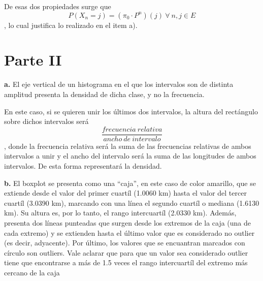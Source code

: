 \documentclass[11pt]{article}
\begin{document}
De esas dos propiedades surge que $$P(X_n = j) = (\pi_0 \cdot P^n)(j)\ \forall\ n,j \in E$$, lo cual justifica lo realizado en el item a).

\section*{Parte II}

\textbf{a.}
El eje vertical de un histograma en el que los intervalos son de distinta amplitud presenta la densidad de dicha clase, y no la frecuencia.

En este caso, si se quieren unir los últimos dos intervalos, la altura del rectángulo sobre dichos intervalos será $$\frac{frecuencia\ relativa}{ancho\ de\ intervalo}$$, donde la frecuencia relativa será la suma de las frecuencias relativas de ambos intervalos a unir y el ancho del intervalo será la suma de las longitudes de ambos intervalos. De esta forma representará la densidad.

\textbf{b.}
El boxplot se presenta como una ``caja'', en este caso de color amarillo, que se extiende desde el valor del primer cuartíl (1.0060 km) hasta el valor del tercer cuartíl (3.0390 km), marcando con una línea el segundo cuartíl o mediana (1.6130 km). Su altura es, por lo tanto, el rango intercuartíl (2.0330 km). Además, presenta dos líneas punteadas que surgen desde los extremos de la caja (una de cada extremo) y se extienden hasta el último valor que es considerado no outlier (es decir, adyacente). Por último, los valores que se encuantran marcados con círculo son outliers. 
Vale aclarar que para que un valor sea considerado outlier tiene que encontrarse a más de 1.5 veces el rango intercuartíl del extremo más cercano de la caja
\end{document}
